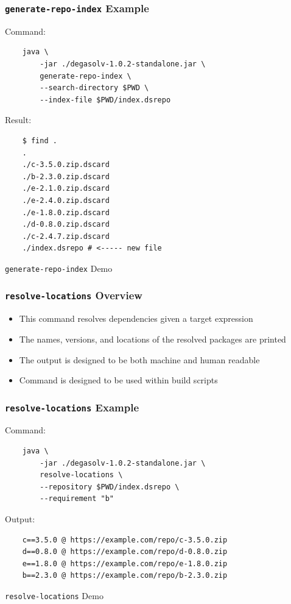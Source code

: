 \documentclass{beamer}
\begin{document}
\begin{frame}[fragile]
  \frametitle{\texttt{generate-repo-index} Example}
  Command:
\begin{verbatim}
    java \
        -jar ./degasolv-1.0.2-standalone.jar \
        generate-repo-index \
        --search-directory $PWD \
        --index-file $PWD/index.dsrepo
\end{verbatim}
  Result:
\begin{verbatim}
    $ find .
    .
    ./c-3.5.0.zip.dscard
    ./b-2.3.0.zip.dscard
    ./e-2.1.0.zip.dscard
    ./e-2.4.0.zip.dscard
    ./e-1.8.0.zip.dscard
    ./d-0.8.0.zip.dscard
    ./c-2.4.7.zip.dscard
    ./index.dsrepo # <----- new file
\end{verbatim}
\end{frame}
\begin{frame}
  \centerline{\color{blue}\Large \texttt{generate-repo-index} Demo}
\end{frame}
\begin{frame}
  \frametitle{\texttt{resolve-locations} Overview}
  \begin{itemize}
  \item This command resolves dependencies given a target expression
  \item The names, versions, and locations of the resolved packages are printed
  \item The output is designed to be both machine and human readable
  \item Command is designed to be used within build scripts
  \end{itemize}
\end{frame}
\begin{frame}[fragile]
  \frametitle{\texttt{resolve-locations} Example}
  Command:
\begin{verbatim}
    java \
        -jar ./degasolv-1.0.2-standalone.jar \
        resolve-locations \
        --repository $PWD/index.dsrepo \
        --requirement "b"
\end{verbatim}
  Output:
\begin{verbatim}
    c==3.5.0 @ https://example.com/repo/c-3.5.0.zip
    d==0.8.0 @ https://example.com/repo/d-0.8.0.zip
    e==1.8.0 @ https://example.com/repo/e-1.8.0.zip
    b==2.3.0 @ https://example.com/repo/b-2.3.0.zip
\end{verbatim}
\end{frame}
\begin{frame}
  \centerline{\color{blue}\Large \texttt{resolve-locations} Demo}
\end{frame}
\end{document}

